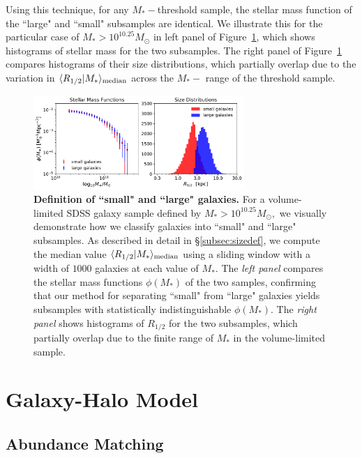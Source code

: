 \documentclass[usenatbib,usegraphicx,letterpaper]{mn2e}
\newcommand{\rhalf}{R_{1/2}}
\newcommand{\mstar}{M_{\ast}}
\newcommand{\median}[2]{\langle{#1}\vert{#2}\rangle_{\rm median}}
\newcommand{\msun}{M_\odot}
\begin{document}
Using this technique, for any $\mstar-$threshold sample, the stellar mass function of the ``large" and ``small" subsamples are identical. We illustrate this for the particular case of $\mstar>10^{10.25}\msun$ in left panel of Figure~\ref{fig:sizedefinition}, which shows histograms of stellar mass for the two subsamples. The right panel of Figure~\ref{fig:sizedefinition} compares histograms of their size distributions, which partially overlap due to the variation in $\median{\rhalf}{\mstar}$ across the $\mstar-$ range of the threshold sample. 

\begin{figure}
\centering
\includegraphics[width=8cm]{FIGS/sdss_small_large_sample_definitions.pdf}
\caption{
{\bf Definition of ``small" and ``large" galaxies.} For a volume-limited SDSS galaxy sample defined by $M_{\ast}>10^{10.25}M_{\odot},$ we visually demonstrate how we classify galaxies into ``small" and ``large" subsamples. As described in detail in \S\ref{subsec:sizedef}, we compute the median value $\median{\rhalf}{\mstar}$ using a sliding window with a width of $1000$ galaxies at each value of $\mstar.$ The {\em left panel} compares the stellar mass functions $\phi(\mstar)$ of the two samples, confirming that our method for separating ``small" from ``large" galaxies yields subsamples with statistically indistinguishable $\phi(\mstar)$. The {\em right panel} shows histograms of $\rhalf$ for the two subsamples, which partially overlap due to the finite range of $\mstar$ in the volume-limited sample. 
}
\label{fig:sizedefinition}
\end{figure}

\section{Galaxy-Halo Model}
\label{sec:model}

\subsection{Abundance Matching}
\label{subsec:sham}
\end{document}
